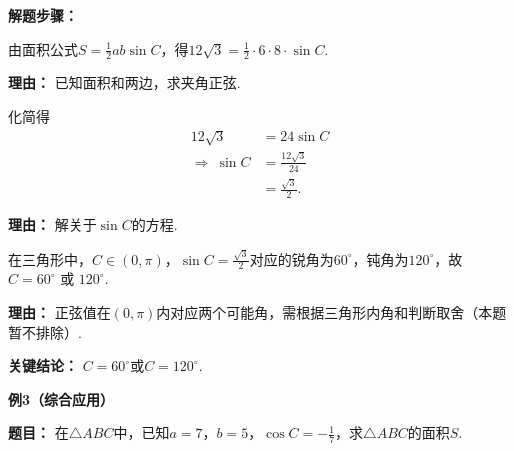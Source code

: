 \begin{examplebox}
	\textbf{\textcolor{CExample}{解题步骤：}}
	\begin{description}[style=nextline, leftmargin=2.8em, labelsep=0.5em, itemsep=0.45em]
		\item[\textbf{第一步（反用公式）：}] 由面积公式$S=\frac12 ab\sin C$，得$12\sqrt{3}=\frac12\cdot6\cdot8\cdot\sin C$.
			\par\textbf{理由：} 已知面积和两边，求夹角正弦.
		\item[\textbf{第二步（求解正弦值）：}] 化简得
			\[
				\begin{aligned}
					12\sqrt{3} &= 24\sin C \\
					\Rightarrow \ \sin C &= \frac{12\sqrt{3}}{24} \\
					&= \frac{\sqrt{3}}{2}.
			\end{aligned}
			\]
			\par\textbf{理由：} 解关于$\sin C$的方程.
		\item[\textbf{第三步（确定角C）：}] 在三角形中，$C\in(0,\pi)$，$\sin C=\frac{\sqrt{3}}{2}$对应的锐角为$60^\circ$，钝角为$120^\circ$，故 $C=60^\circ$ 或 $120^\circ$.
			\par\textbf{理由：} 正弦值在$(0,\pi)$内对应两个可能角，需根据三角形内角和判断取舍（本题暂不排除）.
	\end{description}
	\textbf{\textcolor{CExample}{关键结论：}}
	$C=60^\circ$或$C=120^\circ$.

	\medskip
	\textbf{\textcolor{CExample}{例3（综合应用）}}

	\textbf{\textcolor{CExample}{题目：}}
	在$\triangle ABC$中，已知$a=7$，$b=5$，$\cos C = -\frac17$，求$\triangle ABC$的面积$S$.


\end{examplebox}
